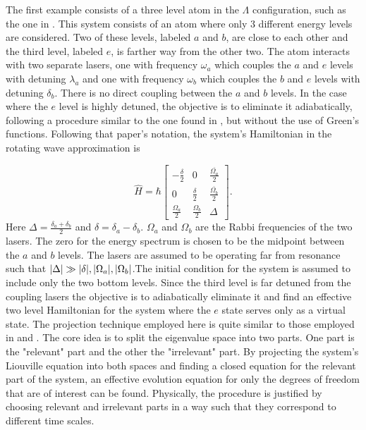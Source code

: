 \documentclass[12pt]{article}
\begin{document}
The first example consists of a three level atom in the $\Lambda$ configuration, such as the one in \cite{Ying3LevelAtom1996}. This system consists of an atom where only 3 different energy levels are considered. Two of these levels, labeled $a$ and $b$, are close to each other and the third level, labeled $e$, is farther way from the other two. The atom interacts with two separate lasers, one with frequency $\omega_a$ which couples the $a$ and $e$ levels with detuning $\lambda_a$ and one with frequency $\omega_b$ which couples the $b$ and $e$ levels with detuning $\delta_b$. There is no direct coupling between the $a$ and $b$ levels. In the case where the $e$ level is highly detuned, the objective is to eliminate it adiabatically, following a procedure similar to the one found in \cite{BrionAdiabatic2006}, but without the use of Green's functions. Following that paper's notation,  the system's Hamiltonian in the rotating wave approximation is

\begin{equation}\label{eq:Lambda_Hamiltonian}
    \widehat{H}=\hbar\left[\begin{array}{ccc}
-\frac{\delta}{2} & 0 & \frac{\overline{\Omega_{a}}}{2} \\
0 & \frac{\delta}{2} & \frac{\overline{\Omega_{b}}}{2} \\
\frac{\Omega_{a}}{2} & \frac{\Omega_{b}}{2} & \Delta
\end{array}\right].
\end{equation} Here $\Delta = \frac{\delta_a+\delta_b}{2}$ and $\delta = \delta_a-\delta_b$. $\Omega_a$ and $\Omega_b$ are the Rabbi frequencies of the two lasers. The zero for the energy spectrum is chosen to be the midpoint between the $a$ and $b$ levels. The lasers are assumed to be operating far from resonance such that $\abs{\Delta} \gg \abs{\delta},\abs{\Omega_a}, \abs{\Omega_b}$.The initial condition for the system is assumed to include only the two bottom levels. Since the third level is far detuned from the coupling lasers the objective is to adiabatically eliminate it and find an effective two level Hamiltonian for the system where the $e$ state serves only as a virtual state\cite{Gerry3LA1990}. The projection technique employed here is quite similar to those employed in \cite{NakajimaProyectors1958} and \cite{ZwanzigProyectors1960}. The core idea is to split the eigenvalue space into two parts. One part is the "relevant" part and the other the "irrelevant" part. By projecting the system's Liouville equation into both spaces and finding a closed equation for the relevant part of the system, an effective evolution equation for only the degrees of freedom that are of interest can be found. Physically, the procedure is justified by choosing relevant and irrelevant parts in a way such that they correspond to different time scales.
\end{document}

